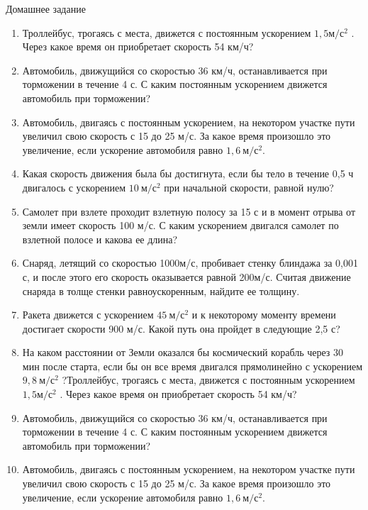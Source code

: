 \documentclass[a5paper, 10pt]{diss_4}
\renewcommand{\'}{\,'}
\begin{document}
\begin{center}
   Домашнее задание
\end{center}
\begin{enumerate}
\item Троллейбус,    трогаясь   с   места,    движется   с   постоянным   ускорением   $1,5   м/с^2$ . Через    какое   время    он    приобретает   скорость 54 км/ч?
\item Автомобиль,     движущийся     со     скоростью   36   км/ч,   останавливается   при   торможении   в   течение   4 с.   С   каким   постоянным  ускорением  движется  автомобиль   при торможении?
\item Автомобиль,   двигаясь   с   постоянным ускорением, на некотором участке пути увеличил свою скорость с 15 до 25 м/с. За какое время произошло это увеличение, если ускорение автомобиля равно $1,6\ м/с^2$.
\item Какая   скорость    движения   была   бы достигнута,   если   бы   тело   в   течение   0,5  ч двигалось с ускорением $10\ м/с^2$ при начальной скорости, равной нулю?
\item Самолет  при   взлете   проходит   взлетную  полосу  за 15 с и  в  момент отрыва от земли   имеет   скорость    100   м/с. С каким ускорением   двигался   самолет   по   взлетной полосе и какова ее длина?
\item Снаряд, летящий со скоростью 1000м/с, пробивает   стенку   блиндажа   за 0,001   с,  и  после этого его скорость  оказывается   равной 200м/с.   Считая    движение снаряда   в   толще   стенки   равноускоренным, найдите ее толщину.
\item Ракета движется с ускорением $45\ м/с^2$ и к некоторому моменту времени достигает скорости  900  м/с.  Какой   путь  она  пройдет в следующие 2,5 с?
\item На   каком   расстоянии от Земли оказался бы космический корабль через 30 мин после старта, если бы   он   все время двигался  прямолинейно с ускорением $9,8\ м/с^2$ ?Троллейбус,    трогаясь   с   места,    движется   с   постоянным   ускорением   $1,5   м/с^2$ . Через    какое   время    он    приобретает   скорость 54 км/ч?
\item Автомобиль,     движущийся     со     скоростью   36   км/ч,   останавливается   при   торможении   в   течение   4 с.   С   каким   постоянным  ускорением  движется  автомобиль   при торможении?
\item Автомобиль,   двигаясь   с   постоянным ускорением, на некотором участке пути увеличил свою скорость с 15 до 25 м/с. За какое время произошло это увеличение, если ускорение автомобиля равно $1,6\ м/с^2$.

\end{enumerate}
\end{document}
